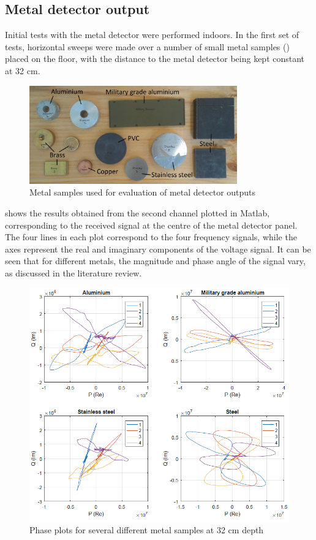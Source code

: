 \documentclass[main.tex]{subfiles}
\begin{document}
\subsection{Metal detector output}
Initial tests with the metal detector were performed indoors. In the first set of tests, horizontal sweeps were made over a number of small metal samples () placed on the floor, with the distance to the metal detector being kept constant at 32 cm. 

\begin{figure}[ht]
\includegraphics[width=0.8\textwidth]{3-ConceptDesign/samples.jpg}
\centering
\caption{Metal samples used for evaluation of metal detector outputs} 
\end{figure}

 shows the results obtained from the second channel plotted in Matlab, corresponding to the received signal at the centre of the metal detector panel. The four lines in each plot correspond to the four frequency signals, while the axes represent the real and imaginary components of the voltage signal. It can be seen that for different metals, the magnitude and phase angle of the signal vary, as discussed in the literature review. 

\begin{figure}[ht]
\includegraphics[width=\textwidth]{3-ConceptDesign/metals.PNG}
\centering
\caption{Phase plots for several different metal samples at 32 cm depth} 
\end{figure}
\end{document}
